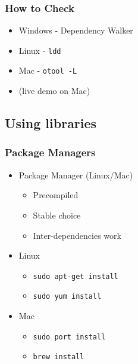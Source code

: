 \subsubsection{How to Check}\label{how-to-check}

\begin{itemize}
\itemsep1pt\parskip0pt
\item
  Windows - Dependency Walker
\item
  Linux - \texttt{ldd}
\item
  Mac - \texttt{otool -L}
\item
  (live demo on Mac)
\end{itemize}

\subsection{Using libraries}\label{using-libraries}

\subsubsection{Package Managers}\label{package-managers}

\begin{itemize}
\itemsep1pt\parskip0pt
\item
  Package Manager (Linux/Mac)

  \begin{itemize}
  \itemsep1pt\parskip0pt
  \item
    Precompiled
  \item
    Stable choice
  \item
    Inter-dependencies work
  \end{itemize}
\item
  Linux

  \begin{itemize}
  \itemsep1pt\parskip0pt
  \item
    \texttt{sudo apt-get install}
  \item
    \texttt{sudo yum install}
  \end{itemize}
\item
  Mac

  \begin{itemize}
  \itemsep1pt\parskip0pt
  \item
    \texttt{sudo port install}
  \item
    \texttt{brew install}
  \end{itemize}
\end{itemize}

